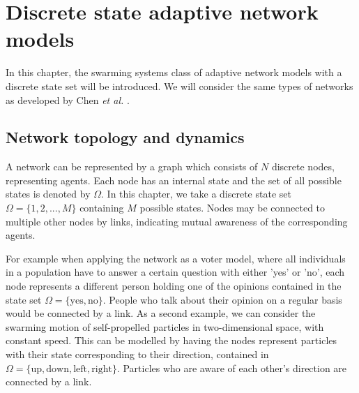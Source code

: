 \chapter{Discrete state adaptive network models}

In this chapter, the swarming systems class of adaptive network models with a discrete state set will be introduced. We will consider the same types of networks as developed by Chen \textit{et al.} \cite{Chen2016}.

\section{Network topology and dynamics}

A network can be represented by a graph which consists of $N$ discrete nodes, representing agents. Each node has an internal state and the set of all possible states is denoted by $\Omega$. In this chapter, we take a discrete state set $\Omega = \{1,2,...,M\}$ containing $M$ possible states. Nodes may be connected to multiple other nodes by links, indicating mutual awareness of the corresponding agents. 

For example when applying the network as a voter model, where all individuals in a population have to answer a certain question with either 'yes' or 'no', each node represents a different person holding one of the opinions contained in the state set $\Omega = \{\text{yes}, \text{no}\}$. People who talk about their opinion on a regular basis would be connected by a link. As a second example, we can consider the swarming motion of self-propelled particles in two-dimensional space, with constant speed. This can be modelled by having the nodes represent particles with their state corresponding to their direction, contained in $\Omega = \{\text{up}, \text{down}, \text{left}, \text{right}\}$. Particles who are aware of each other's direction are connected by a link. 

